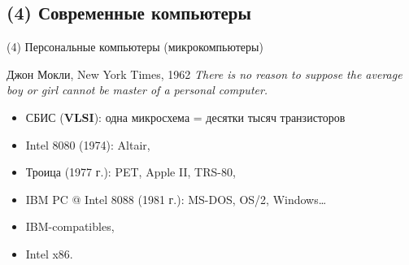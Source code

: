 \subsection {(4) Современные компьютеры}

\begin{frame}{(4) Персональные компьютеры (микрокомпьютеры)}
\begin{block}{Джон Мокли, New York Times, 1962}
    \textit{There is no reason to suppose the average boy or girl cannot be master of a personal computer.}
\end{block}
\pause
\begin{itemize}
    \item СБИС (\textbf{VLSI}): одна микросхема = десятки тысяч транзисторов
    \item Intel 8080 (1974): Altair,
    \item Троица (1977 г.): PET, Apple II, TRS-80,
    \item IBM PC @ Intel 8088 (1981 г.): MS-DOS, OS/2, Windows…
    \item IBM-compatibles,
    \item Intel x86.
\end{itemize}
\end{frame}


